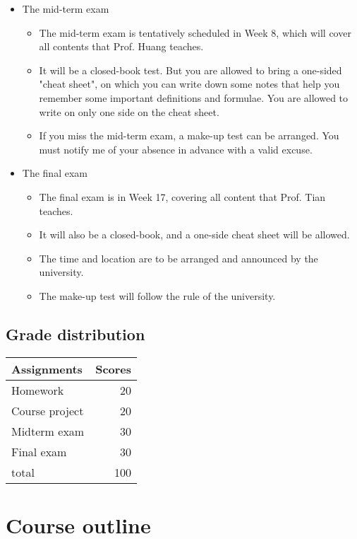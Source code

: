 \documentclass[a4paper,11pt]{article}
\begin{document}
\begin{itemize}
\item The mid-term exam
\label{sec:orgce917a7}
\begin{itemize}
\item The mid-term exam is tentatively scheduled in Week 8, which will
cover all contents that Prof. Huang teaches.
\item It will be a closed-book test. But you are allowed to bring a
one-sided "cheat sheet", on which you can write down some notes that
help you remember some important definitions and formulae. You are
allowed to write on only one side on the cheat sheet.
\item If you miss the mid-term exam, a make-up test can be arranged. You
must notify me of your absence in advance with a valid excuse.
\end{itemize}

\item The final exam
\label{sec:orgfb58f36}
\begin{itemize}
\item The final exam is in Week 17, covering all content that Prof. Tian
teaches.
\item It will also be a closed-book, and a one-side cheat sheet will be
allowed.
\item The time and location are to be arranged and announced by the
university.
\item The make-up test will follow the rule of the university.
\end{itemize}
\end{itemize}


\subsection*{Grade distribution}
\label{sec:org7d32a31}

\begin{center}
\begin{tabular}{lr}
Assignments & Scores\\
\hline
Homework & 20\\
Course project & 20\\
Midterm exam & 30\\
Final exam & 30\\
\hline
total & 100\\
\end{tabular}
\end{center}


\section{Course outline}
\label{sec:org269b0da}
\end{document}
